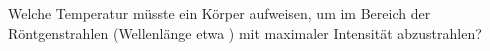 Welche Temperatur müsste ein Körper aufweisen, um im Bereich der Röntgenstrahlen (Wellenlänge etwa \lRO) mit maximaler Intensität abzustrahlen?
